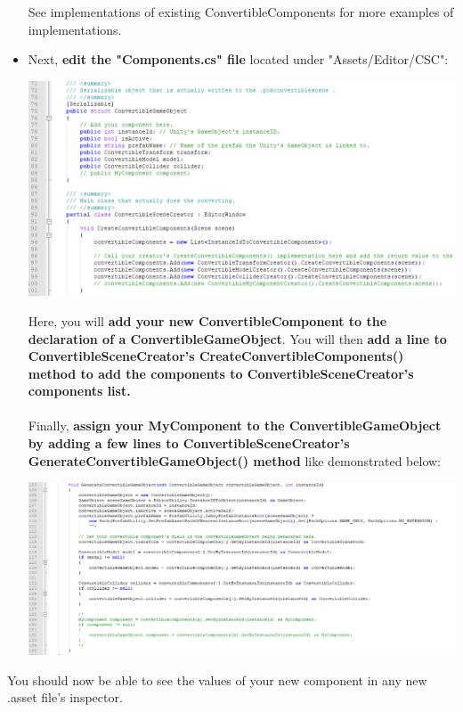 \documentclass[10pt,a4paper]{article}
\begin{document}
\begin{itemize}
See implementations of existing ConvertibleComponents for more examples of implementations.
\newpage
\item Next, \textbf{edit the "Components.cs" file} located under "Assets/Editor/CSC":
\begin{center}
\includegraphics[scale=0.65]{componentsContents0}
\end{center}
Here, you will \textbf{add your new ConvertibleComponent to the declaration of a ConvertibleGameObject}. You will then \textbf{add a line to ConvertibleSceneCreator's CreateConvertibleComponents() method to add the components to ConvertibleSceneCreator's components list.}\\\\
Finally, \textbf{assign your MyComponent to the ConvertibleGameObject by adding a few lines to ConvertibleSceneCreator's GenerateConvertibleGameObject() method} like demonstrated below:
\begin{center}
\includegraphics[scale=0.55]{componentsContents1}
\end{center}
\end{itemize}
You should now be able to see the values of your new component in any new .asset file's inspector.
\end{document}
